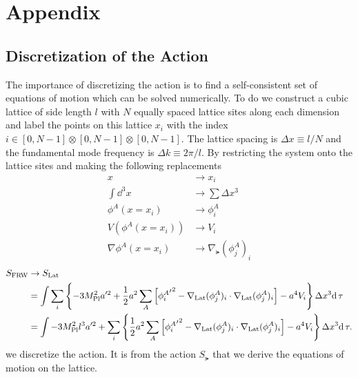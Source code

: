 
\section{Appendix}

\subsection{Discretization of the Action}
The importance of discretizing the action is to find a self-consistent set of equations of motion which can be solved numerically. 
To do we construct a cubic lattice of side length $l$ with $N$ equally spaced lattice sites along each dimension and label the points on this lattice $x_i$ with the index $i\in[0,N-1]\otimes[0,N-1]\otimes[0,N-1]$.
The lattice spacing is $\Delta x \equiv l/N$ and the fundamental mode frequency is $\Delta k \equiv 2\pi/l$.
By restricting the system onto the lattice sites and making the following replacements
\begin{align}
  x &\to x_i \\
  \int \dd^3x &\to \sum \Delta x^3 \\
  \phi^A(x=x_i) &\to \phi^A_i \\
  V(\phi^A(x=x_i)) &\to V_i \\
  \nabla\phi^A(x=x_i) &\to \nabla_\lat(\phi^A_j)_i
\end{align}
\begin{align}
  S_{\mathrm{FRW}} & \to S_{\mathrm{Lat}} \\
  & = \int\sum_i\left\{ - 3M_{\mathrm{Pl}}^2a'^2
  + \frac{1}{2}a^2\sum_A \left[ {{\phi^A_i}'}^2 - \nabla_{\mathrm{Lat}}(\phi^A_j)_i\cdot\nabla_{\mathrm{Lat}}(\phi^A_j)_i \right]
  - a^4 V_i \right\}\Delta x^3 \mathrm{d}\,\tau \\
  & = \int - 3M_{\mathrm{Pl}}^2l^3a'^2 
  + \sum_i\left\{ \frac{1}{2}a^2\sum_A \left[ {{\phi^A_i}'}^2 - \nabla_{\mathrm{Lat}}(\phi^A_j)_i\cdot\nabla_{\mathrm{Lat}}(\phi^A_j)_i \right]
  - a^4 V_i \right\}\Delta x^3 \mathrm{d}\,\tau.
\end{align}
we discretize the action.
It is from the action $S_\lat$ that we derive the equations of motion on the lattice.

